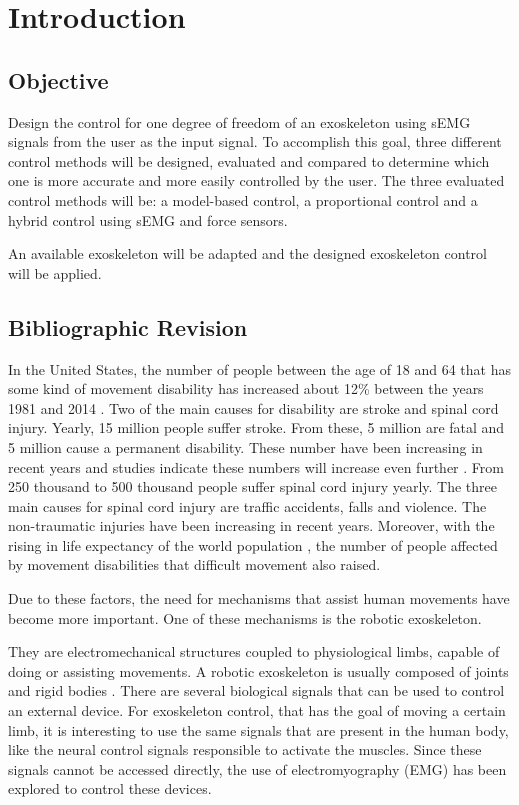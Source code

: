 \chapter{Introduction}
    
    \section{Objective}
    
    Design the control for one degree of freedom of an exoskeleton using sEMG signals from the user as the input signal. To accomplish this goal, three different control methods will be designed, evaluated and compared to determine which  one is more accurate and more easily controlled by the user. The three evaluated control methods will be: a model-based control, a proportional control and a hybrid control using sEMG and force sensors.
    
    An available exoskeleton will be adapted and the designed exoskeleton control will be applied.	    
    
    
    \section{Bibliographic Revision}
    
    In the United States, the number of people between the age of 18 and 64 that has some kind of movement disability has increased about 12\% between the years 1981 and 2014 \cite{VonSchrader2017}. Two of the main causes for disability are stroke and spinal cord injury. Yearly, 15 million people suffer stroke. From these, 5 million are fatal and 5 million cause a permanent disability. These number have been increasing in recent years and studies indicate these numbers will increase even further \cite{mackay2004atlas}. From 250 thousand to 500 thousand people suffer spinal cord injury yearly. The three main causes for spinal cord injury are traffic accidents, falls and violence. The non-traumatic injuries have been increasing in recent years. Moreover, with the rising in life expectancy of the world population \cite{UN}, the number of people affected by movement disabilities that difficult movement also raised.

	Due to these factors, the need for mechanisms that assist human movements have become more important. One of these mechanisms is the robotic exoskeleton.
    
	They are electromechanical structures coupled to physiological limbs, capable of doing or assisting movements. A robotic exoskeleton is usually composed of joints and rigid bodies \cite{pons2008wearable}.
There are several biological signals that can be used to control an external device. For exoskeleton control, that has the goal of moving a certain limb, it is interesting to use the same signals that are present in the human body, like the neural control signals responsible to activate the muscles. Since these signals cannot be accessed directly, the use of electromyography (EMG) has been explored to control these devices.
	

